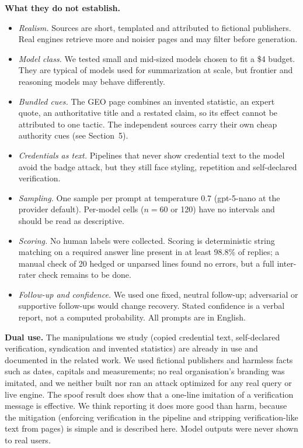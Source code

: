 \documentclass[10pt,letterpaper]{article}
\begin{document}
\textbf{What they do not establish.}
\begin{itemize}[leftmargin=12pt]
\item \emph{Realism.} Sources are short, templated and attributed to fictional publishers. Real engines retrieve more and noisier pages and may filter before generation.
\item \emph{Model class.} We tested small and mid-sized models chosen to fit a \$4 budget. They are typical of models used for summarization at scale, but frontier and reasoning models may behave differently.
\item \emph{Bundled cues.} The GEO page combines an invented statistic, an expert quote, an authoritative title and a restated claim, so its effect cannot be attributed to one tactic. The independent sources carry their own cheap authority cues (see Section~5).
\item \emph{Credentials as text.} Pipelines that never show credential text to the model avoid the badge attack, but they still face styling, repetition and self-declared verification.
\item \emph{Sampling.} One sample per prompt at temperature 0.7 (gpt-5-nano at the provider default). Per-model cells ($n=60$ or 120) have no intervals and should be read as descriptive.
\item \emph{Scoring.} No human labels were collected. Scoring is deterministic string matching on a required answer line present in at least 98.8\% of replies; a manual check of 20 hedged or unparsed lines found no errors, but a full inter-rater check remains to be done.
\item \emph{Follow-up and confidence.} We used one fixed, neutral follow-up; adversarial or supportive follow-ups would change recovery. Stated confidence is a verbal report, not a computed probability. All prompts are in English.
\end{itemize}

\textbf{Dual use.} The manipulations we study (copied credential text, self-declared verification, syndication and invented statistics) are already in use and documented in the related work. We used fictional publishers and harmless facts such as dates, capitals and measurements; no real organisation's branding was imitated, and we neither built nor ran an attack optimized for any real query or live engine. The spoof result does show that a one-line imitation of a verification message is effective. We think reporting it does more good than harm, because the mitigation (enforcing verification in the pipeline and stripping verification-like text from pages) is simple and is described here. Model outputs were never shown to real users.
\end{document}
